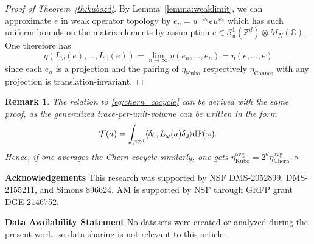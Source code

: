 \documentclass[12pt]{amsart}
\newtheorem{remark}[theorem]{Remark}
\newcommand{\CM}{{\mathbb C}}
\newcommand{\ZM}{{\mathbb Z}}
\newcommand{\PM}{{\mathbb P}}
\newcommand{\Ss}{{\mathcal S}}
\newcommand{\Tt}{{\mathcal T}}
\newcommand{\difd}{\textup{d}}
\begin{document}
\begin{proof}[Proof of Theorem~\ref{th:kubozd}]
By Lemma~\ref{lemma:weaklimit}, we can approximate $e$ in weak operator topology by $e_n=u^{-x_n} e u^{x_n}$ which has such uniform bounds on the matrix elements by assumption $e\in \Ss_u^1(\ZM^d)\otimes M_N(\CM)$. One therefore has
$$\eta(L_\omega(e),\dots,L_\omega(e))=\lim_{n\to \infty} \eta(e_n,\dots,e_n)= \eta(e,\dots,e)$$
since each $e_n$ is a projection and the pairing of $\eta_{\mathrm{Kubo}}$ respectively $\eta_{\mathrm{Connes}}$ with any projection is translation-invariant.
\end{proof}

\begin{remark}{\rm 
The relation to \eqref{eq:chern_cocycle} can be derived with the same proof, as the generalized trace-per-unit-volume can be written in the form
$$\Tt(a)=\int_{\beta\ZM^d}\langle \delta_0, L_\omega(a)\delta_0\rangle \difd\PM(\omega).$$
Hence, if one averages the Chern cocycle similarly, one gets $\eta^{\mathrm{avg}}_{\mathrm{Kubo}}= 2^d\eta^{\mathrm{avg}}_{\mathrm{Chern}}$.}$\diamond$
\end{remark}

\textbf{Acknowledgements}
This research was supported by NSF DMS-2052899, DMS-2155211, and Simons
896624. AM is supported by NSF through GRFP grant DGE-2146752.


\textbf{Data Availability Statement}
No datasets were created or analyzed during the present work, so data sharing is not relevant to this article.


\printbibliography 
\end{document}
